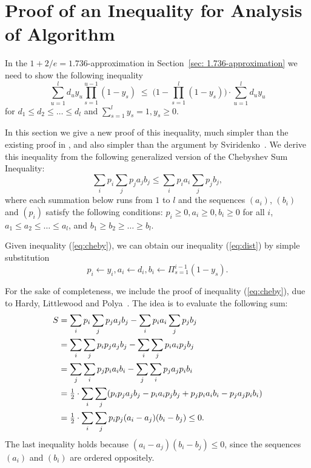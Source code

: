 \documentclass[11pt]{article}
\begin{document}

\section{Proof of an Inequality for Analysis of Algorithm~{\ECHS}}

In the $1+2/e=1.736$-approximation in Section~\ref{sec: 1.736-approximation}
we need to show the following inequality
%
\begin{equation}
  \label{eq:dist}
\sum_{u=1}^l d_uy_u\prod_{s=1}^{u-1}(1-y_s)
  \;\leq\;  \Big(1 - \prod_{s=1}^l (1-y_s)\Big) \cdot \sum_{u=1}^l d_u y_u
\end{equation}
%
for $d_1\leq d_2 \leq \ldots \leq d_l$ and $\sum_{s=1}^l y_s = 1, y_s \geq 0$.

In this section we give a new proof of this inequality, much
simpler than the existing proof in \cite{ChudakS04}, and also simpler than
the argument by Sviridenko~\cite{Svi02}.  
We derive this inequality from the following generalized version of the Chebyshev Sum
Inequality:
%
\begin{equation}
  \label{eq:cheby}
  \sum_{i} p_i \sum_j p_j a_j b_j \leq \sum_i p_i a_i \sum_j p_j b_j,
\end{equation}
%
where each summation below runs from $1$ to $l$ and the sequences 
$(a_i)$, $(b_i)$ and $(p_i)$ satisfy the following conditions:
$p_i\geq 0, a_i \geq 0, b_i \geq 0$ for all $i$, $a_1\leq a_2 \leq
\ldots \leq a_l$, and $b_1 \geq b_2 \geq \ldots \geq b_l$.

Given inequality (\ref{eq:cheby}), we can obtain our inequality
(\ref{eq:dist}) by simple substitution
%
\begin{equation*}
  p_i \leftarrow y_i, a_i \leftarrow d_i, b_i \leftarrow
  \Pi_{s=1}^{i-1} (1-y_s).
\end{equation*}

For the sake of completeness, we include the proof of inequality (\ref{eq:cheby}), 
due to Hardy, Littlewood and Polya~\cite{HardyLP88}. The idea is to evaluate the 
following sum:
%
\begin{align*}
  S &= \sum_i p_i \sum_j p_j a_j b_j - \sum_i p_i a_i \sum_j p_j b_j
	\\
  & = \sum_i \sum_j p_i p_j a_j b_j - \sum_i \sum_j p_i a_i p_j b_j
	\\
  & = \sum_j \sum_i p_j p_i a_i b_i - \sum_j \sum _i p_j a_j p_i b_i
	\\
	&= {\mbox{$\frac{1}{2}$}} \cdot \sum_i \sum_j (p_i p_j a_j b_j - p_i a_i p_j b_j + p_j p_i a_i
  							b_i - p_j a_j p_i b_i)
\\
  &= {\mbox{$\frac{1}{2}$}} \cdot \sum_i \sum_j p_i p_j (a_i - a_j)(b_i - b_j) \leq 0.
\end{align*}
The last inequality holds because $(a_i-a_j)(b_i-b_j) \leq 0$, since the sequences
$(a_i)$ and $(b_i)$ are ordered oppositely.
\end{document}
